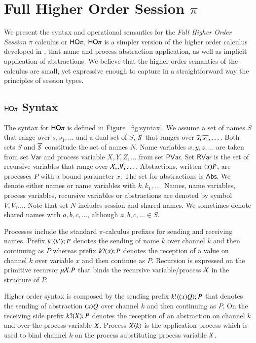 \section{Full Higher Order Session $\pi$}

We present the syntax and operational semantics for the
{\em Full Higher Order Session $\pi$} calculus or $\mathsf{HO}\pi$.
$\mathsf{HO}\pi$ is a simpler version of the higher order calculus developed
in \cite{tlca07}, that name and process abstraction application, as
well as implicit application of abstractions. We believe that
the higher order semantics of the calculus are small, yet expressive
enough to capture in a straightforward way the principles of
session types.

\subsection{$\mathsf{HO}\pi$ Syntax}

The syntax for $\mathsf{HO}\pi$ is defined in Figure~\ref{fig:syntax}.
We assume a set of names $S$ that range over $s, s_1, \dots$
and a dual set of $S$, $\overline{S}$ that ranges over $\overline{s}, \overline{s_1}, \dots$.
Both sets $S$ and $\overline{S}$ constitude the set of names $N$.
Name variables $x, y, z, \dots$ are taken from set $\mathsf{Var}$ and
process variable $X, Y, Z, \dots$ from set $\mathsf{PVar}$. 
Set $\mathsf{RVar}$ is the set of recursive 
variables that range over $\mathcal{X}, \mathcal{Y}, \dots$.
Abstactions, written $(x)P$, are processes $P$ with a bound parameter $x$.
The set for abstractions is $\mathsf{Abs}$.
We denote either names or name variables with $k, k_1, \dots$.
Names, name variables, process variables, recursive variables or abstractions
are denoted by symbol $V, V_1 \dots$.
Note that set $N$ includes session and shared names.
We sometimes denote shared names with $a,b, c, \dots$, although $a, b, c, \dots \in S$.

Processes include the standard $\pi$-calculus prefixes for sending and receiving names.
Prefix $k ! \langle k' \rangle ; P$ denotes the sending of name $k$ over channel $k$ and then
continuing as $P$ whereas prefix $k ? (x) ; P$ denotes the reception of a value
on channel $k$ over variable $x$ and then continue as $P$. Recursion is expressed
on the primitive recursor $\mu \mathcal{X}. P$ that binds the recursive variable/process
$\mathcal{X}$ in the structure of $P$.

Higher order syntax is composed by the sending prefix $k ! \langle (x)Q \rangle ; P$ that
denotes the sending of abstraction $(x)Q$ over channel $k$ and then continuing
as $P$. On the receiving side prefix $k ? (X) ; P$ denotes the reception of an abstraction
on channel $k$ and over the process variable $X$. Process $X\langle k \rangle$ is the application
process which is used to bind channel $k$ on the process substituting process variable $X$.

